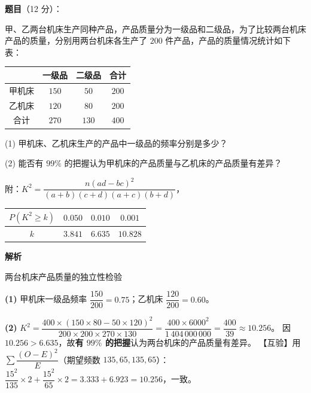 \begin{answer}

\textbf{题目}（12 分）：

甲、乙两台机床生产同种产品，产品质量分为一级品和二级品，为了比较两台机床产品的质量，分别用两台机床各生产了 $200$ 件产品，产品的质量情况统计如下表：

\begin{center}
\begin{tabular}{cccc}
\toprule
 & 一级品 & 二级品 & 合计 \\
\midrule
甲机床 & $150$ & $50$ & $200$ \\
乙机床 & $120$ & $80$ & $200$ \\
合计 & $270$ & $130$ & $400$ \\
\bottomrule
\end{tabular}
\end{center}

  (1) 甲机床、乙机床生产的产品中一级品的频率分别是多少？

  (2) 能否有 $99\%$ 的把握认为甲机床的产品质量与乙机床的产品质量有差异？

  附：$K^{2}=\dfrac{n(ad-bc)^{2}}{(a+b)(c+d)(a+c)(b+d)}$，

\begin{center}
\begin{tabular}{cccc}
\toprule
$P(K^{2}\geqslant k)$ & $0.050$ & $0.010$ & $0.001$ \\
\midrule
$k$ & $3.841$ & $6.635$ & $10.828$ \\
\bottomrule
\end{tabular}
\end{center}

\textbf{解析}

两台机床产品质量的独立性检验

\begin{gktip}
\textbf{(1)} 甲机床一级品频率 $\dfrac{150}{200}=0.75$；乙机床 $\dfrac{120}{200}=0.60$。

\textbf{(2)} $K^2=\dfrac{400\times(150\times80-50\times120)^2}{200\times200\times270\times130}=\dfrac{400\times6000^2}{1\,404\,000\,000}=\dfrac{400}{39}\approx10.256$。
因 $10.256>6.635$，故\textbf{有 $99\%$ 的把握}认为两台机床的产品质量有差异。
【互验】用 $\sum\dfrac{(O-E)^2}E$（期望频数 $135,65,135,65$）：$\dfrac{15^2}{135}\times2+\dfrac{15^2}{65}\times2=3.333+6.923=10.256$，一致。
\end{gktip}



\end{answer}
